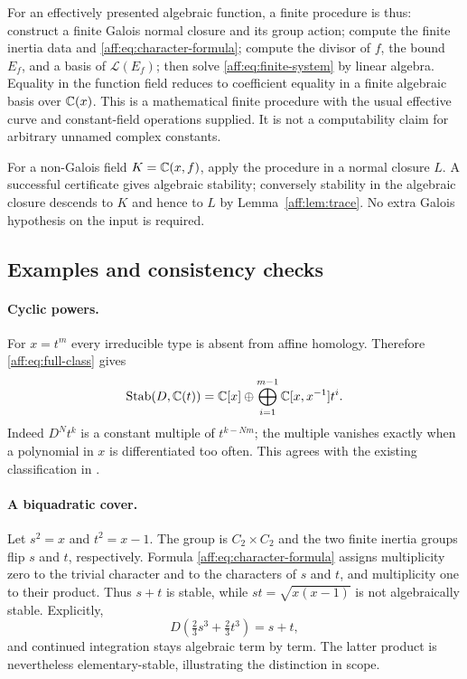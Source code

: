 For an effectively presented algebraic function, a finite procedure is thus:
construct a finite Galois normal closure and its group action; compute the
finite inertia data and \eqref{aff:eq:character-formula}; compute the divisor of
$f$, the bound $E_f$, and a basis of $\mathcal L(E_f)$; then solve
\eqref{aff:eq:finite-system} by linear algebra. Equality in the function field
reduces to coefficient equality in a finite algebraic basis over $\mathbb C(x)$.
This is a mathematical finite procedure with the usual effective curve and
constant-field operations supplied. It is not a computability claim for
arbitrary unnamed complex constants.

For a non-Galois field $K=\mathbb C(x,f)$, apply the procedure in a normal closure
$L$. A successful certificate gives algebraic stability; conversely stability
in the algebraic closure descends to $K$ and hence to $L$ by
Lemma~\ref{aff:lem:trace}. No extra Galois hypothesis on the input is required.

\subsection{Examples and consistency checks}

\paragraph{Cyclic powers.}
For $x=t^m$ every irreducible type is absent from affine homology. Therefore
\eqref{aff:eq:full-class} gives
\[
 \operatorname{Stab}(D,\mathbb C(t))=\mathbb C[x]\oplus
       \bigoplus_{i=1}^{m-1}\mathbb C[x,x^{-1}]t^i.
\]
Indeed $D^Nt^k$ is a constant multiple of $t^{k-Nm}$; the multiple vanishes
exactly when a polynomial in $x$ is differentiated too often. This agrees
with the existing classification in \cite[Proposition~5.3(iii)]{SSS2025}.

\paragraph{A biquadratic cover.}
Let $s^2=x$ and $t^2=x-1$. The group is $C_2\times C_2$ and the two finite
inertia groups flip $s$ and $t$, respectively. Formula
\eqref{aff:eq:character-formula} assigns multiplicity zero to the trivial
character and to the characters of $s$ and $t$, and multiplicity one to
their product. Thus $s+t$ is stable, while $st=\sqrt{x(x-1)}$ is not
algebraically stable. Explicitly,
\[
 D\left(\tfrac23s^3+\tfrac23t^3\right)=s+t,
\]
and continued integration stays algebraic term by term. The latter product
is nevertheless elementary-stable, illustrating the distinction in scope.

